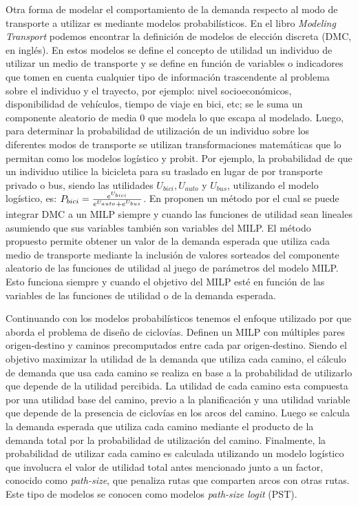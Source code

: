 \documentclass{article}
\begin{document}
  Otra forma de modelar el comportamiento de la demanda respecto al modo de transporte a utilizar es mediante modelos probabilísticos. En el libro {\it Modeling Transport} \cite{ortuz2011} podemos encontrar la definición de modelos de elección discreta (DMC, en inglés). En estos modelos se define el concepto de utilidad un individuo de utilizar un medio de transporte y se define en función de variables o indicadores que tomen en cuenta cualquier tipo de información trascendente al problema sobre el individuo y el trayecto, por ejemplo: nivel socioeconómicos, disponibilidad de vehículos, tiempo de viaje en bici, etc; se le suma un componente aleatorio de media 0 que modela lo que escapa al modelado. Luego, para determinar la probabilidad de utilización de un individuo sobre los diferentes modos de transporte se utilizan transformaciones matemáticas que lo permitan como los modelos logístico y probit. Por ejemplo, la probabilidad de que un individuo utilice la bicicleta para su traslado en lugar de por transporte privado o bus, siendo las utilidades $U_{bici}, U_{auto}$ y $U_{bus}$, utilizando el modelo logístico, es: $P_{bici} = {e^{U_{bici}} \over {e^{U_{auto}} + e^{U_{bus}}}}$. En \cite{Pacheco2021} proponen un método por el cual se puede integrar DMC a un MILP siempre y cuando las funciones de utilidad sean lineales asumiendo que sus variables también son variables del MILP. El método propuesto permite obtener un valor de la demanda esperada que utiliza cada medio de transporte mediante la inclusión de valores sorteados del componente aleatorio de las funciones de utilidad al juego de parámetros del modelo MILP. Esto funciona siempre y cuando el objetivo del MILP esté en función de las variables de las funciones de utilidad o de la demanda esperada.

  Continuando con los modelos probabilísticos tenemos el enfoque utilizado por \cite{liu2019} que aborda el problema de diseño de ciclovías. Definen un MILP con múltiples pares origen-destino y caminos precomputados entre cada par origen-destino. Siendo el objetivo maximizar la utilidad de la demanda que utiliza cada camino, el cálculo de demanda que usa cada camino se realiza en base a la probabilidad de utilizarlo que depende de la utilidad percibida. La utilidad de cada camino esta compuesta por una utilidad base del camino, previo a la planificación y una utilidad variable que depende de la presencia de ciclovías en los arcos del camino. Luego se calcula la demanda esperada que utiliza cada camino mediante el producto de la demanda total por la probabilidad de utilización del camino. Finalmente, la probabilidad de utilizar cada camino es calculada utilizando un modelo logístico que involucra el valor de utilidad total antes mencionado junto a un factor, conocido como {\it path-size}, que penaliza rutas que comparten arcos con otras rutas. Este tipo de modelos se conocen como modelos {\it path-size logit} (PST).
\end{document}
